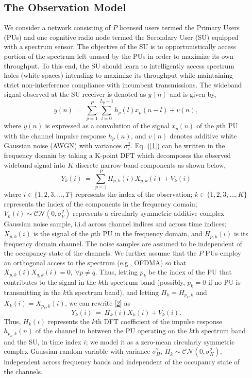 \documentclass[10pt,twocolumn]{IEEEtran}
\begin{document}
\subsection{The Observation Model}
We consider a network consisting of $P$ licensed users termed the Primary Users (PUs) and one cognitive radio node termed the Secondary User (SU) equipped with a spectrum sensor. The objective of the SU is to opportunistically access portion of the spectrum left unused by the PUs in order to maximize its own throughput. To this end, the SU should learn to intelligently access spectrum holes (white-spaces) intending to maximize its throughput while maintaining strict non-interference compliance with incumbent transmissions. The wideband signal observed at the SU receiver is denoted as $y(n)$ and is given by,
\begin{equation}\label{1}
    y(n)\ =\ \sum_{p=1}^{P}\sum_{l=0}^{L_{p}-1} h_{p}(l)x_{p}(n-l) + v(n),
\end{equation}
where $y(n)$ is expressed as a convolution of the signal $x_{p}(n)$ of the $p$th PU with the channel impulse response $h_{p}(n)$, and $v(n)$ denotes additive white Gaussian noise (AWGN) with variances $\sigma_v^2$. Eq. (\ref{1}) can be written in the frequency domain by taking a K-point DFT which decomposes the observed wideband signal into $K$ discrete narrow-band components as shown below,
\begin{equation}\label{2}
    Y_k(i)\ =\ \sum_{p=1}^{P}H_{p,k}(i)X_{p,k}(i)+V_k(i)
\end{equation}
where $i \in \{1,2,3,\dots,T\}$ represents the index of the observation; $k \in \{1,2,3,\dots,K\}$ represents the index of the components in the frequency domain; $V_k(i) \sim \mathcal{CN}(0,\sigma_V^2)$ represents a circularly symmetric additive complex Gaussian noise sample, i.i.d across channel indices and across time indices; $X_{p,k}(i)$ is the signal of the $p$th PU in the frequency domain, and $H_{p,k}(i)$ is its frequency domain channel. The noise samples are assumed to be independent of the occupancy state of the channels. We further assume that the $P$ PUs employ an orthogonal access to the spectrum (e.g., OFDMA) so that $X_{p,k}(i)X_{q,k}(i)=0,\ \forall p\neq q$. Thus, letting $p_k$ be the index of the PU that contributes to the signal in the $k$th spectrum band (possibly, $p_k=0$ if no PU is transmitting in the $k$th spectrum band), and letting  $H_{k}=H_{p_k,k}$ and $X_{k}(i)=X_{p_k,k}(i)$, we can rewrite \eqref{2} as
\begin{equation}\label{3}
    Y_k(i)\ =\ H_{k}(i)X_{k}(i) + V_k(i).
\end{equation}
Thus, $H_k(i)$ represents the $k$th DFT coefficient of the impulse response $h_{p_k,k}(n)$ of the channel in between the PU operating on the $k$th spectrum band and the SU, in time index $i$; we model it as a zero-mean circularly symmetric complex Gaussian random variable with variance $\sigma_H^2$, $H_k \sim \mathcal{CN}(0,\sigma_H^2)$, independent across frequency bands and independent of the occupancy state of the channels.
\end{document}

